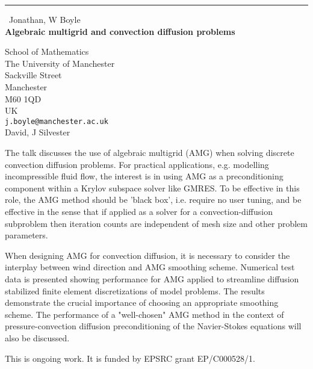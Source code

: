 \documentclass{report}
\begin{document}
\begin{center}
\rule{6in}{1pt} \
{\large Jonathan, W Boyle \\
{\bf Algebraic multigrid and convection diffusion problems}}

School of Mathematics \\ The University of Manchester \\ Sackville Street \\ Manchester \\ M60 1QD \\ UK
\\
{\tt j.boyle@manchester.ac.uk}\\
David, J Silvester\end{center}

The talk discusses the use of algebraic multigrid (AMG) when solving
discrete convection diffusion problems. For practical applications, e.g.
modelling incompressible fluid flow, the interest is in using AMG as a
preconditioning component within a Krylov subspace solver like GMRES. To
be effective in this role, the AMG method should be 'black box', i.e.
require no user tuning, and be effective in the sense that if applied as
a solver for a convection-diffusion subproblem then iteration counts are
independent of mesh size and other problem parameters.

When designing AMG for convection diffusion, it is necessary to consider
the interplay between wind direction and AMG smoothing scheme. Numerical
test data is presented showing performance for AMG applied to streamline
diffusion stabilized finite element discretizations of model problems.
The results demonstrate the crucial importance of choosing an appropriate
smoothing
scheme. The performance of a "well-chosen" AMG method in the context of
pressure-convection diffusion preconditioning of the Navier-Stokes
equations will also be discussed.

This is ongoing work. It is funded by EPSRC grant EP/C000528/1.
\end{document}
